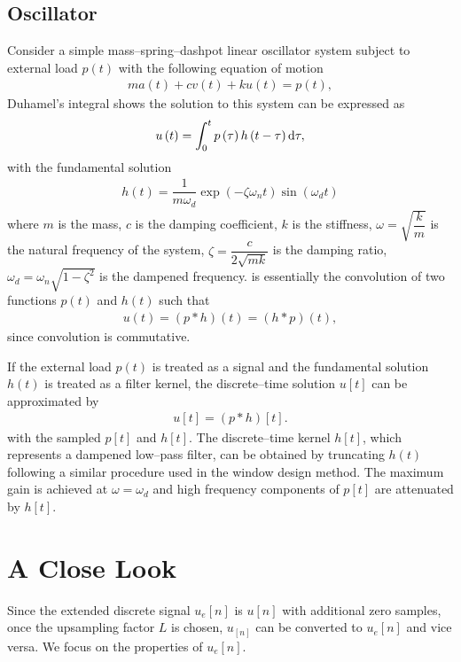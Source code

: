 \subsection{Oscillator}
Consider a simple mass--spring--dashpot linear oscillator system subject to external load $p\left(t\right)$ with the following equation of motion
\begin{gather}
ma\left(t\right)+cv\left(t\right)+ku\left(t\right)=p\left(t\right),
\end{gather}
Duhamel's integral shows the solution to this system can be expressed as
\begin{gather}\label{eq:duhamel}
u\left(t\right)=\int_{0}^{t}p\left(\tau\right)h\left(t-\tau\right)\mathrm{d}\tau,
\end{gather}
with the fundamental solution
\begin{gather}
h\left(t\right)=\dfrac{1}{m\omega_d}\exp\left(-\zeta\omega_nt\right)\sin\left(\omega_dt\right)
\end{gather}
where $m$ is the mass, $c$ is the damping coefficient, $k$ is the stiffness, $\omega=\sqrt{\dfrac{k}{m}}$ is the natural frequency of the system, $\zeta=\dfrac{c}{2\sqrt{mk}}$ is the damping ratio, $\omega_d=\omega_n\sqrt{1-\zeta^2}$ is the dampened frequency.  is essentially the convolution of two functions $p\left(t\right)$ and $h\left(t\right)$ such that
\begin{gather}
u\left(t\right)=\left(p\ast{}h\right)\left(t\right)=\left(h\ast{}p\right)\left(t\right),
\end{gather}
since convolution is commutative.

If the external load $p\left(t\right)$ is treated as a signal and the fundamental solution $h\left(t\right)$ is treated as a filter kernel, the discrete--time solution $u[t]$ can be approximated by
\begin{gather}
u[t]=\left(p\ast{}h\right)[t].
\end{gather}
with the sampled $p[t]$ and $h[t]$. The discrete--time kernel $h[t]$, which represents a dampened low--pass filter, can be obtained by truncating $h\left(t\right)$ following a similar procedure used in the window design method. The maximum gain is achieved at $\omega=\omega_d$ and high frequency components of $p[t]$ are attenuated by $h[t]$.
\section{A Close Look}
Since the extended discrete signal $u_e[n]$ is $u[n]$ with additional zero samples, once the upsampling factor $L$ is chosen, $u_[n]$ can be converted to $u_e[n]$ and vice versa. We focus on the properties of $u_e[n]$.

